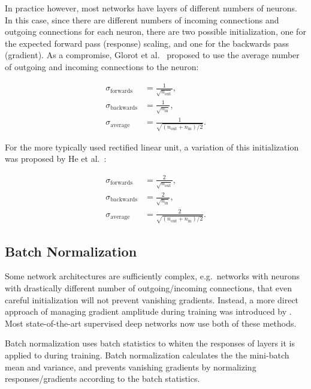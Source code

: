 \documentclass[thesis]{subfiles}
\begin{document}
In practice however, most networks have layers of different numbers of neurons. In this case, since there are different numbers of incoming connections and outgoing connections for each neuron, there are two possible initialization, one for the expected forward pass (response) scaling, and one for the backwards pass (gradient). As a compromise, Glorot et al.~\cite{glorot2010understanding} proposed to use the average number of outgoing and incoming connections to the neuron:

\begin{equation}
\begin{aligned}
	\sigma_{\textrm{forwards}} &= \frac{1}{\sqrt{n_{\text{out}}}},\\
	\sigma_{\textrm{backwards}} &= \frac{1}{\sqrt{n_{\text{in}}}},\\
	\sigma_{\textrm{average}} &= \frac{1}{\sqrt{(n_{\text{out}} + n_{\text{in}})/2}}.
\end{aligned}
\end{equation}

For the more typically used rectified linear unit, a variation of this initialization was proposed by He et al.~\cite{He2015b}:

\begin{equation}
\begin{aligned}
	\sigma_{\textrm{forwards}} &= \frac{2}{\sqrt{n_{\text{out}}}},\\
	\sigma_{\textrm{backwards}} &= \frac{2}{\sqrt{n_{\text{in}}}},\\
	\sigma_{\textrm{average}} &= \frac{2}{\sqrt{(n_{\text{out}} + n_{\text{in}})/2}}.
\end{aligned}
\end{equation}

\subsection{Batch Normalization}
Some network architectures are sufficiently complex, e.g.~networks with neurons with drastically different number of outgoing/incoming connections, that even careful initialization will not prevent vanishing gradients. Instead, a more direct approach of managing gradient amplitude during training was introduced by \citet{Ioffe2015}. Most state-of-the-art supervised deep networks now use both of these methods.

Batch normalization uses batch statistics to whiten the responses of layers it is applied to during training. Batch normalization calculates the the mini-batch mean and variance, and prevents vanishing gradients by normalizing responses/gradients according to the batch statistics. 
\end{document}
